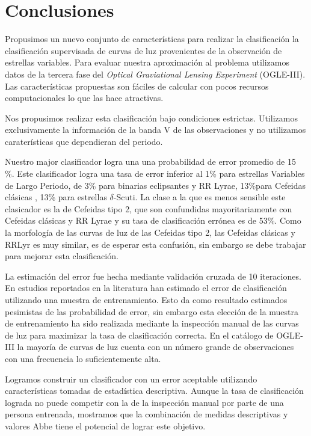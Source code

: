 \documentclass[letterpaper,12pt]{book}
\begin{document}
\chapter{Conclusiones}

Propusimos un nuevo conjunto de características para realizar la clasificación la clasificación supervisada de curvas de luz provenientes de la observación de estrellas variables. Para evaluar nuestra aproximación al problema utilizamos datos de la tercera fase del \textit{Optical Graviational Lensing Experiment} (OGLE-III). Las características propuestas son fáciles de calcular con pocos recursos computacionales lo que las hace atractivas.

Nos propusimos realizar esta clasificación bajo condiciones estrictas. Utilizamos exclusivamente la información de la banda V de las observaciones y no utilizamos caraterísticas que dependieran del periodo.  

Nuestro major clasificador logra una una probabilidad de error promedio de 15 \%. Este clasificador logra una tasa de error inferior al 1\% para estrellas Variables de Largo Periodo, de 3\% para  binarias eclipsantes y RR Lyrae, 13\%para Cefeidas clásicas , 13\% para estrellas $\delta$-Scuti. La clase a la que es menos sensible este clasicador es la de Cefeidas tipo 2, que son confundidas mayoritariamente con Cefeidas clásicas y RR Lyrae y su tasa de clasificación errónea es de 53\%. Como la morfología de las curvas de luz de las Cefeidas tipo 2, las Cefeidas clásicas y RRLyr es muy similar, es de esperar esta confusión, sin embargo se debe trabajar para mejorar esta clasificación. 

La estimación del error fue hecha mediante validación cruzada de 10 iteraciones. En estudios reportados en la literatura han estimado el error de clasificación utilizando una muestra de entrenamiento. Esto da como resultado estimados pesimistas de las probabilidad de error, sin embargo esta elección de la muestra de entrenamiento ha sido realizada mediante la inspección manual de las curvas de luz para maximizar la tasa de clasificación correcta. En el catálogo de OGLE-III la mayoría de curvas de luz cuenta con un número grande de observaciones con una frecuencia lo suficientemente alta. 

Logramos construir un clasificador con un error aceptable utilizando características tomadas de estadística descriptiva. Aunque la tasa de clasificación lograda no puede competir con la de la inspección manual por parte de una persona entrenada, mostramos que la combinación de medidas descriptivas y valores Abbe tiene el potencial de lograr este objetivo.    
\end{document}
